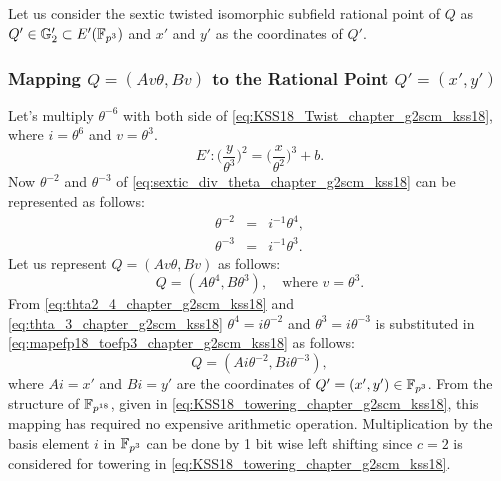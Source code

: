 Let us consider the sextic twisted isomorphic subfield rational point of $Q$ as $Q' \in {\mathbb{G}}_{2}' \subset E'({\mathbb{F}}_{p^{3}})$ and $x'$ and $y'$ as the coordinates of $Q'$.

\subsubsection{Mapping \texorpdfstring{$Q = (Av\theta, Bv)$}{}  to the Rational Point  \texorpdfstring{$Q' = (x',y')$}{}}

Let's multiply  $\theta^{-6}$ with both side of \eqref{eq:KSS18_Twist_chapter_g2scm_kss18}, where $i=\theta^6$ and $v = \theta^3$.
\begin{equation}\label{eq:sextic_div_theta_chapter_g2scm_kss18}
E':  \Big(\frac{y}{\theta^3}\Big)^2  = \Big(\frac{x}{\theta^2}\Big)^3+ b.
\end{equation}
 Now $\theta^{-2}$ and $\theta^{-3}$ of  \eqref{eq:sextic_div_theta_chapter_g2scm_kss18} can be represented as follows:
 \begin{subequations}
 \begin{eqnarray}
 \theta^{-2} &  = & i^{-1}\theta^{4}, \label{eq:thta2_4_chapter_g2scm_kss18} \\
 \theta^{-3} &  = & i^{-1}\theta^{3}.\label{eq:thta_3_chapter_g2scm_kss18} 
 \end{eqnarray}
 \end{subequations}
Let us represent $Q = (Av\theta, Bv)$  as follows:
\begin{equation}\label{eq:mapefp18_toefp3_chapter_g2scm_kss18}
Q  =  (A\theta^4, B\theta^3), \quad \text{where $v=\theta^3$}.
\end{equation}
From \eqref{eq:thta2_4_chapter_g2scm_kss18} and \eqref{eq:thta_3_chapter_g2scm_kss18} $ \theta^4 = i\theta^{-2}$ and $\theta^3 = i\theta^{-3}$  is substituted in \eqref{eq:mapefp18_toefp3_chapter_g2scm_kss18}  as 
follows:
\begin{equation}\label{eq:mapefp18_toefp3_chapter_g2scm_kss18.1}
Q  =  (Ai\theta^{-2}, Bi\theta^{-3}),
\end{equation}
where $Ai = x'$ and $Bi = y'$ are the coordinates of $Q' =(x',y') \in \mathbb{F}_{p^3}$. 
 From the structure of $\mathbb{F}_{p^{18}}$, given in \ref{eq:KSS18_towering_chapter_g2scm_kss18}, this mapping has required no expensive arithmetic operation. Multiplication by the basis element $i$ in $\mathbb{F}_{p^3}$ can be done by 1 bit wise left shifting since $c=2$ is considered for towering in \ref{eq:KSS18_towering_chapter_g2scm_kss18}.


